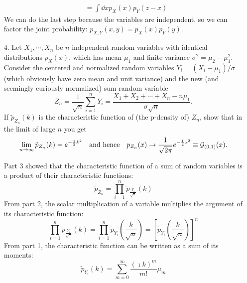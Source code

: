 \documentclass[a4paper,twoside]{article}
\begin{document}
\begin{itemize}
\begin{problem}
\begin{align}
                &= \int \dd{x} p_X(x) p_Y(z - x) 
            \end{align}
            We can do the last step because the variables are independent, so we can factor the joint probability: $ p_{X,Y}(x,y) = p_{X}(x) p_{Y}(y) $.
        \end{problem}
    \item[4.] Let $ X_1, \cdots, X_n $ be $ n $ independent random variables with identical distributions $ p_X(x) $, which has mean $ \mu_1 $ and finite variance $ \sigma^2 = \mu_2 - \mu_1^2 $. Consider the centered and normalized random variables $ Y_i = (X_i - \mu_1)/ \sigma $ (which obviously have zero mean and unit variance) and the new (and seemingly curiously normalized) sum random variable
        \begin{equation}
            Z_n = \frac{1}{\sqrt{n}} \sum_{i=1}^{n} Y_i = \frac{X_1 + X_2 + \cdots + X_n - n \mu_1}{\sigma \sqrt{n}}.
        \end{equation}
        If $ \tilde{p}_{Z_n}(k) $ is the characteristic function of (the p-density of) $ Z_n $, show that in the limit of large $ n $ you get
        \begin{equation}
            \lim_{n \to \infty} \tilde{p}_{Z_n}(k) = e^{- \frac{1}{2} k^2} \qq{and hence} p_{Z_n}(x) \to \frac{1}{\sqrt{2 \pi}} e^{- \frac{1}{2} x^2} \equiv \mathcal{G}_{(0,1)}(x).
        \end{equation}
        \begin{problem}
            Part 3 showed that the characteristic function of a sum of random variables is a product of their characteristic functions:
            \begin{equation}
                \tilde{p}_{Z_n} = \prod_{i=1}^{n} \tilde{p}_{\frac{Y_i}{\sqrt{n}}}(k)
            \end{equation}
            From part 2, the scalar multiplication of a variable multiplies the argument of its characteristic function:
            \begin{equation}
                \prod_{i=1}^{n} \tilde{p}_{\frac{Y_i}{\sqrt{n}}}(k) = \prod_{i=1}^{n} \tilde{p}_{Y_i}\left(\frac{k}{\sqrt{n}}\right) = \left[ \tilde{p}_{Y_i}\left(\frac{k}{\sqrt{n}}\right) \right]^n
            \end{equation}
            From part 1, the characteristic function can be written as a sum of its moments:
            \begin{equation}
                \tilde{p}_{Y_i}(k) = \sum_{m=0}^{\infty} \frac{(\imath k)^m}{m!} \mu_m
            \end{equation}

\end{problem}
\end{itemize}
\end{document}
